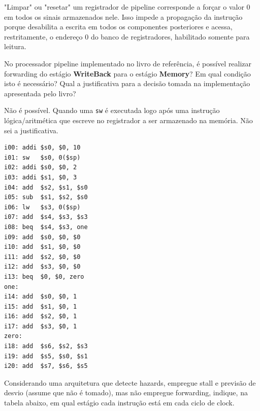 \documentclass{article}
\begin{document}
\noindent "Limpar" ou "resetar" um registrador de pipeline corresponde a forçar o valor 0 em todos os sinais armazenados nele. Isso impede a propagação da instrução porque desabilita a escrita em todos os componentes posteriores e acessa, restritamente, o endereço 0 do banco de registradores, habilitado somente para leitura.
\bigbreak

{\large No processador pipeline implementado no livro de referência, é possível realizar forwarding do estágio \textbf{WriteBack} para o estágio \textbf{Memory}? Em qual condição isto é necessário? Qual a justificativa para a decisão tomada na implementação apresentada pelo livro?\vspace{1mm}}

\noindent Não é possível. Quando uma \verb|sw| é executada logo após uma instrução lógica/aritmética que escreve no registrador a ser armazenado na memória. Não sei a justificativa.
\bigbreak

\begin{center}
    \begin{minipage}{0.475\textwidth}
        \begin{lstlisting}[frame=single]
i00: addi $s0, $0, 10
i01: sw   $s0, 0($sp)
i02: addi $s0, $0, 2
i03: addi $s1, $0, 3
i04: add  $s2, $s1, $s0
i05: sub  $s1, $s2, $s0
i06: lw   $s3, 0($sp)
i07: add  $s4, $s3, $s3
i08: beq  $s4, $s3, one
i09: add  $s0, $0, $0
i10: add  $s1, $0, $0
i11: add  $s2, $0, $0
i12: add  $s3, $0, $0
i13: beq  $0, $0, zero
one:
i14: add  $s0, $0, 1
i15: add  $s1, $0, 1
i16: add  $s2, $0, 1
i17: add  $s3, $0, 1
zero:
i18: add  $s6, $s2, $s3
i19: add  $s5, $s0, $s1
i20: add  $s7, $s6, $s5
        \end{lstlisting}
    \end{minipage}
\end{center}

\pagebreak

{\large Considerando uma arquitetura que detecte hazards, empregue stall e previsão de desvio (assume que não é tomado), mas não empregue forwarding, indique, na tabela abaixo, em qual estágio cada instrução está em cada ciclo de clock.}
\end{document}
